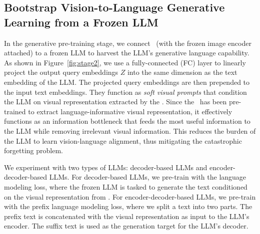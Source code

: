 \subsection{Bootstrap Vision-to-Language Generative Learning from a Frozen LLM}
\vspace{-0.5ex}
In the generative pre-training stage,
we connect \name~(with the frozen image encoder attached) to a frozen LLM to harvest the LLM's generative language capability.
As shown in Figure~\ref{fig:stage2},
we use a fully-connected (FC) layer to linearly project the output query embeddings $Z$ into the same dimension as the text embedding of the LLM. 
The projected query embeddings are then prepended to the input text embeddings.
They function as \textit{soft visual prompts} that condition the LLM on visual representation extracted by the \name.
Since the \name~has been pre-trained to extract language-informative visual representation,
it effectively functions as an information bottleneck that feeds the most useful information to the LLM while removing irrelevant visual information.
This reduces the burden of the LLM to learn vision-language alignment,
thus mitigating the catastrophic forgetting problem.


We experiment with two types of LLMs: decoder-based LLMs and encoder-decoder-based LLMs.
For decoder-based LLMs,
we pre-train with the language modeling loss,
where the frozen LLM is tasked to generate the text conditioned on the visual representation from \name.
For encoder-decoder-based LLMs,
we pre-train with the prefix language modeling loss,
where we split a text into two parts.
The prefix text is concatenated with the visual representation as input to the LLM's encoder.
The suffix text is used as the generation target for the LLM's decoder.




